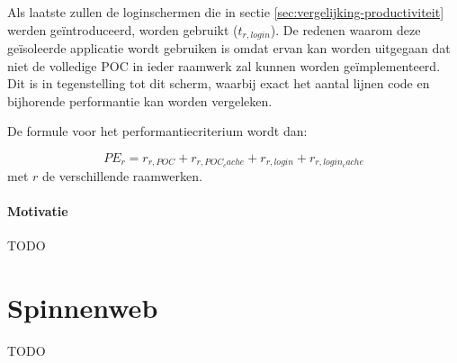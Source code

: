 Als laatste zullen de loginschermen die in sectie \ref{sec:vergelijking-productiviteit} werden geïntroduceerd, worden gebruikt ($t_{r,login}$). 
De redenen waarom deze geïsoleerde applicatie wordt gebruiken is omdat ervan kan worden uitgegaan dat niet de volledige POC in ieder raamwerk zal kunnen worden geïmplementeerd. 
Dit is in tegenstelling tot dit scherm, waarbij exact het aantal lijnen code en bijhorende performantie kan worden vergeleken.


De formule voor het performantiecriterium wordt dan: 

\begin{equation}
  PE_r=r_{r,POC}+r_{r,POC_cache}+r_{r,login}+r_{r,login_cache} 
  \label{eq:performantie}
\end{equation}
met $r$ de verschillende raamwerken.


\paragraph{Motivatie}
TODO


\section{Spinnenweb}
\label{sec:spinnenweb}

TODO

